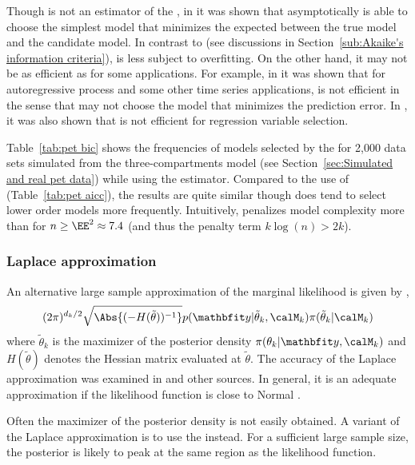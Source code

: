 Though \bic is not an estimator of the \kldfull, in \cite{Sin:1996vs} it was shown that asymptotically \bic is able to choose the simplest model that minimizes the expected \kld between the true model and the candidate model. In contrast to \aic (see discussions in Section~\ref{sub:Akaike's information criteria}), \bic is less subject to overfitting. On the other hand, it may not be as efficient as \aic for some applications. For example, in \cite{Lee:2001tm} it was shown that for autoregressive process and some other time series applications, \bic is not efficient in the sense that \bic may not choose the model that minimizes the prediction error. In \cite[][sec.~4.7]{Claeskens:2008tq}, it was also shown that \bic is not efficient for regression variable selection.

Table~\ref{tab:pet bic} shows the frequencies of models selected by the \bic for 2,000 \pet data sets simulated from the three-compartments model (see Section~\ref{sec:Simulated and real pet data}) while using the \nls estimator. Compared to the use of \aicc (Table~\ref{tab:pet aicc}), the results are quite similar though \bic does tend to select lower order models more frequently. Intuitively, \bic penalizes model complexity more than \aic for $n\ge\EE^2\approx7.4$ (and thus the penalty term $k\log(n) > 2k$).



\subsubsection{Laplace approximation}
\label{ssub:Laplace approximation}

An alternative large sample approximation of the marginal likelihood is given
by \cite{Tierney:1986vx},
\begin{equation}
  (2\pi)^{d_k/2}\sqrt{\Abs{(-H(\tilde\theta))^{-1}}}
  p(\data|\tilde\theta_k,\calM_k)\pi(\tilde\theta_k|\calM_k)
\end{equation}
where $\tilde\theta_k$ is the maximizer of the posterior density $\pi(\theta_k|\data,\calM_k)$ and $H(\tilde\theta)$ denotes the Hessian matrix evaluated at $\tilde\theta$. The accuracy of the Laplace approximation was examined in \cite{Kass:1992tz} and other sources. In general, it is an adequate approximation if the likelihood function is close to Normal \cite{Kass:1995vb}.

Often the maximizer of the posterior density is not easily obtained. A variant of the Laplace approximation is to use the \mle instead. For a sufficient large sample size, the posterior is likely to peak at the same region as the likelihood function.

